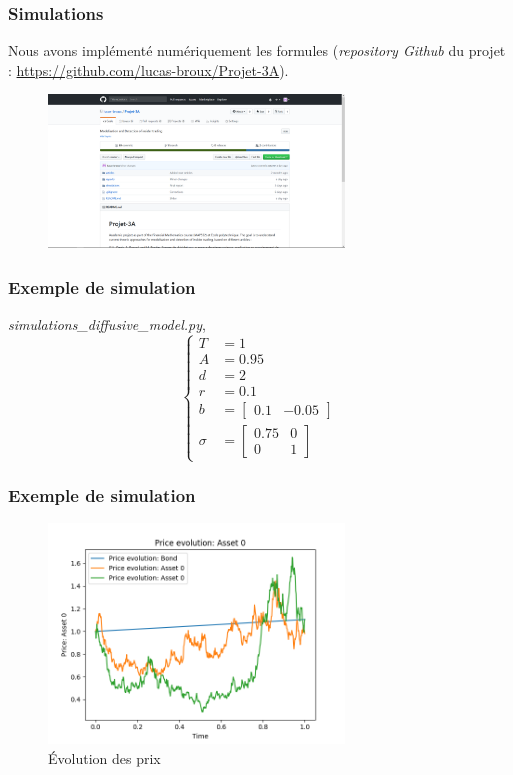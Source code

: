 \documentclass{beamer}
\begin{document}
\begin{frame}
\frametitle{Simulations}
\par Nous avons implémenté numériquement les formules (\emph{repository Github} du projet : \url{https://github.com/lucas-broux/Projet-3A}).
\begin{figure}[H]
  \centering
    \includegraphics[width=0.7\textwidth]{images/github.png}
  \caption{}
\end{figure}

\end{frame}

\begin{frame}
\frametitle{Exemple de simulation}
\par \emph{simulations\_diffusive\_model.py}, 
\begin{displaymath}
\begin{cases}
T &= 1 \\
A &= 0.95 \\
d &= 2 \\
r &= 0.1 \\
b &= \begin{bmatrix}
		0.1 & -0.05
	\end{bmatrix} \\
\sigma &= \begin{bmatrix}
			0.75 & 0 \\
			0 & 1
		  \end{bmatrix}
\end{cases}
\end{displaymath}
\end{frame}

\begin{frame}
\frametitle{Exemple de simulation}
\begin{figure}[H]
  \centering
    \includegraphics[width=0.7\textwidth]{images/simulation_1/prices.png}
  \caption{Évolution des prix}
\end{figure}

\end{frame}
\end{document}
